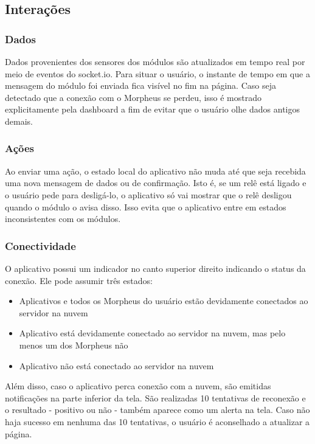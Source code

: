 \subsection{Interações}

\subsubsection{Dados}

Dados provenientes dos sensores dos módulos são atualizados em tempo real por meio de eventos do socket.io. Para situar o usuário, o instante de tempo em que a mensagem do módulo foi enviada fica visível no fim na página. Caso seja detectado que a conexão com o Morpheus se perdeu, isso é mostrado explicitamente pela dashboard a fim de evitar que o usuário olhe dados antigos demais.

\subsubsection{Ações}

Ao enviar uma ação, o estado local do aplicativo não muda até que seja recebida uma nova mensagem de dados ou de confirmação. Isto é, se um relê está ligado e o usuário pede para desligá-lo, o aplicativo só vai mostrar que o relê desligou quando o módulo o avisa disso. Isso evita que o aplicativo entre em estados inconsistentes com os módulos.

\subsubsection{Conectividade}

O aplicativo possui um indicador no canto superior direito indicando o status da conexão. Ele pode assumir três estados:

\begin{itemize}
\item Aplicativos e todos os Morpheus do usuário estão devidamente conectados ao servidor na nuvem
\item Aplicativo está devidamente conectado ao servidor na nuvem, mas pelo menos um dos Morpheus não
\item Aplicativo não está conectado ao servidor na nuvem
\end{itemize}

Além disso, caso o aplicativo perca conexão com a nuvem, são emitidas notificações na parte inferior da tela. São realizadas 10 tentativas de reconexão e o resultado - positivo ou não - também aparece como um alerta na tela. Caso não haja sucesso em nenhuma das 10 tentativas, o usuário é aconselhado a atualizar a página.

